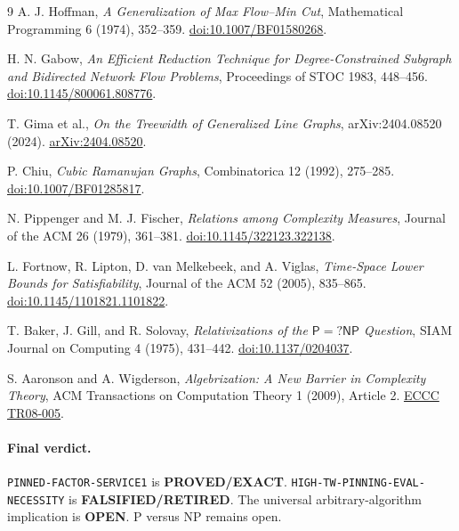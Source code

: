 \documentclass[11pt]{article}
\newcommand{\Status}[1]{\textbf{#1}}
\newcommand{\OPEN}{\Status{OPEN}}
\newcommand{\EXACT}{\Status{PROVED/EXACT}}
\newcommand{\RETIRED}{\Status{FALSIFIED/RETIRED}}
\begin{document}
\begin{thebibliography}{9}
A. J. Hoffman,
\emph{A Generalization of Max Flow--Min Cut},
Mathematical Programming 6 (1974), 352--359.
\href{https://doi.org/10.1007/BF01580268}{doi:10.1007/BF01580268}.

H. N. Gabow,
\emph{An Efficient Reduction Technique for Degree-Constrained Subgraph and
Bidirected Network Flow Problems},
Proceedings of STOC 1983, 448--456.
\href{https://doi.org/10.1145/800061.808776}{doi:10.1145/800061.808776}.

T. Gima et al.,
\emph{On the Treewidth of Generalized Line Graphs},
arXiv:2404.08520 (2024).
\href{https://arxiv.org/abs/2404.08520}{arXiv:2404.08520}.

P. Chiu,
\emph{Cubic Ramanujan Graphs},
Combinatorica 12 (1992), 275--285.
\href{https://doi.org/10.1007/BF01285817}{doi:10.1007/BF01285817}.

N. Pippenger and M. J. Fischer,
\emph{Relations among Complexity Measures},
Journal of the ACM 26 (1979), 361--381.
\href{https://doi.org/10.1145/322123.322138}{doi:10.1145/322123.322138}.

L. Fortnow, R. Lipton, D. van Melkebeek, and A. Viglas,
\emph{Time-Space Lower Bounds for Satisfiability},
Journal of the ACM 52 (2005), 835--865.
\href{https://doi.org/10.1145/1101821.1101822}{doi:10.1145/1101821.1101822}.

T. Baker, J. Gill, and R. Solovay,
\emph{Relativizations of the \(\mathsf{P}=?\mathsf{NP}\) Question},
SIAM Journal on Computing 4 (1975), 431--442.
\href{https://doi.org/10.1137/0204037}{doi:10.1137/0204037}.

S. Aaronson and A. Wigderson,
\emph{Algebrization: A New Barrier in Complexity Theory},
ACM Transactions on Computation Theory 1 (2009), Article 2.
\href{https://eccc.weizmann.ac.il/report/2008/005/}{ECCC TR08-005}.
\end{thebibliography}

\paragraph{Final verdict.}
\texttt{PINNED-FACTOR-SERVICE1} is \EXACT.
\texttt{HIGH-TW-PINNING-EVAL-NECESSITY} is \RETIRED.
The universal arbitrary-algorithm implication is \OPEN.
P versus NP remains open.

\end{document}
